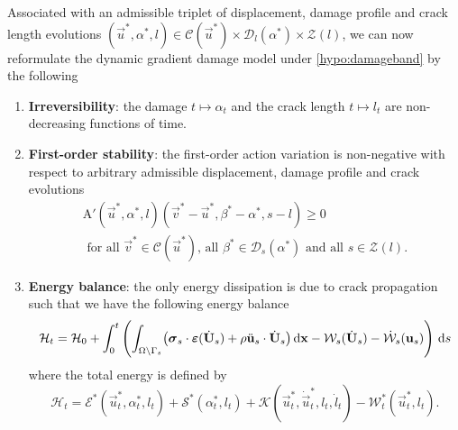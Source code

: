 Associated with an admissible triplet of displacement, damage profile and crack length evolutions $(\vec{u}^*,\alpha^*,l)\in\mathcal{C}(\vec{u}^*)\times\mathcal{D}_l(\alpha^*)\times\mathcal{Z}(l)$, we can now reformulate the dynamic gradient damage model under \cref{hypo:damageband} by the following
\begin{definition} \noindent \label{def:dynagraddamanew}
\begin{enumerate}
\item \textbf{Irreversibility}: the damage $t\mapsto\alpha_t$ and the crack length $t\mapsto l_t$ are non-decreasing functions of time.
\item \textbf{First-order stability}: the first-order action variation is non-negative with respect to arbitrary admissible displacement, damage profile and crack evolutions
\begin{multline} \label{eq:vi2}
\mathrm{A}'(\vec{u}^*,\alpha^*,l)(\vec{v}^*-\vec{u}^*,\beta^*-\alpha^*,s-l)\geq 0 \\
\text{ for all $\vec{v}^*\in\mathcal{C}(\vec{u}^*)$, all $\beta^*\in\mathcal{D}_s(\alpha^*)$ and all $s\in\mathcal{Z}(l)$}.
\end{multline}
\item \textbf{Energy balance}: the only energy dissipation is due to crack propagation such that we have the following energy balance
\begin{equation} \label{eq:dyngdeb3}
\mathcal{H}_t=\mathcal{H}_0+\int_0^t\left(\int_{\Omega\setminus\Gamma_s}\bigl(\sig_s\cdot\eps(\dot{\vec{U}}_s)+\rho\ddot{\vec{u}}_s\cdot\dot{\vec{U}}_s\bigr)\dx-\mathcal{W}_s(\dot{\vec{U}}_s)-\dot{\mathcal{W}}_s(\vec{u}_s)\right)\D{s}
\end{equation}
where the total energy is defined by
\begin{equation}
\mathcal{H}_t=\mathcal{E}^*(\vec{u}_t^*,\alpha_t^*,l_t)+\mathcal{S}^*(\alpha_t^*,l_t)+\mathcal{K}(\vec{u}_t^*,\dot{\vec{u}}_t^*,l_t,\dot{l}_t)-\mathcal{W}_t^*(\vec{u}_t^*,l_t).
\end{equation}
\end{enumerate}
\end{definition}

